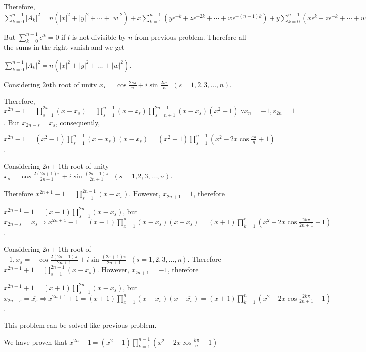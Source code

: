   Therefore, $\displaystyle\sum_{k=0}^{n - 1}|A_k|^2 = n(|x|^2 + |y|^2 + \cdots + |w|^2) + x\sum_{k=1}^{n -
    1}(\overline{y}\epsilon^{-k} + \overline{z}\epsilon^{-2k} + \cdots + \overline{w}\epsilon^{-(n - 1)k}) +
  y\sum_{k=0}^{n - 1}(\overline{x}\epsilon^k + \overline{z}\epsilon^{-k} + \cdots +
  \overline{w}\epsilon^{-(n - 2)k}) + \cdots + w\sum_{k = 0}^{n - 1}(\overline{x}\epsilon^{(n - 1)k}+
  \overline{y}\epsilon^{(n - 2)k} + \cdots + \overline{u}\epsilon^k)$

  But $\displaystyle\sum_{k=0}^{n - 1}\epsilon^{lk} = 0$ if $l$ is not divisible by $n$ from previous
  problem. Therefore all the sums in the right vanish and we get

  $\displaystyle\sum_{k = 0}^{n - 1}|A_k|^2 = n(|x|^2 + |y|^2 + \ldots + |w|^2)$.
\item Considering $2n$th root of unity $x_s = \cos\frac{2s\pi}{n} + i\sin\frac{2s\pi}{n}\;\;(s = 1, 2, 3,
  \ldots, n)$.

  Therefore, $x^{2n} - 1 = \displaystyle\prod_{s=1}^{2n}(x - x_s) = \prod_{s=1}^{n - 1}(x - x_s)
  \prod_{s=n + 1}^{2n - 1}(x - x_s)(x^2 - 1)\;\because x_n = -1, x_{2n} = 1$. But $x_{2n - s} =
  \overline{x_s}$, consequently,

  $x^{2n} - 1 = (x^2 - 1)\displaystyle\prod_{s = 1}^{n - 1}(x - x_s)(x - \overline{x_s}) = (x^2 - 1)\prod_{s
    = 1}^{n - 1}(x^2 - 2x\cos\frac{s\pi}{n} + 1)$.
\item Considering $2n + 1$th root of unity $x_s = \cos\frac{2(2s + 1)\pi}{2n + 1} + i\sin\frac{(2s +
  1)\pi}{2n + 1}\;\;(s = 1, 2, 3, \ldots, n)$.

  Therefore $x^{2n + 1} - 1 = \displaystyle\prod_{s = 1}^{2n + 1}(x - x_s)$. However, $x_{2n + 1} = 1$,
  therefore

  $x^{2n + 1} - 1 = \displaystyle(x - 1)\prod_{s=1}^{2n}(x - x_s)$, but $x_{2n - s} = \displaystyle\overline{x_s}
  \Rightarrow x^{2n + 1} - 1 = (x - 1)\prod_{x=1}^{n}(x - x_s)(x - \overline{x_s}) = (x +
  1)\displaystyle\prod_{k = 1}^n\left(x^2 - 2x\cos\frac{2k\pi}{2n + 1} + 1\right)$.
\item Considering $2n + 1$th root of $-1, x_s = -\cos\frac{2(2s + 1)\pi}{2n + 1} + i\sin\frac{(2s +
  1)\pi}{2n + 1}\;\;(s = 1, 2, 3, \ldots, n)$.
  Therefore $x^{2n + 1} + 1 = \displaystyle\prod_{s = 1}^{2n + 1}(x - x_s)$. However, $x_{2n + 1} = -1$,
  therefore

  $x^{2n + 1} + 1 = \displaystyle(x + 1)\prod_{s=1}^{2n}(x - x_s)$, but $x_{2n - s} = \displaystyle\overline{x_s}
  \Rightarrow x^{2n + 1} + 1 = (x + 1)\prod_{x=1}^{n}(x - x_s)(x - \overline{x_s}) = (x +
  1)\displaystyle\prod_{k = 1}^n\left(x^2 + 2x\cos\frac{2k\pi}{2n + 1} + 1\right)$.
\item This problem can be solved like previous problem.
\item We have proven that $x^{2n} - 1 = (x^2 - 1)\displaystyle\prod_{k = 1}^{n - 1}\left(x^2 -
  2x\cos\frac{k\pi}{n} + 1\right)$


